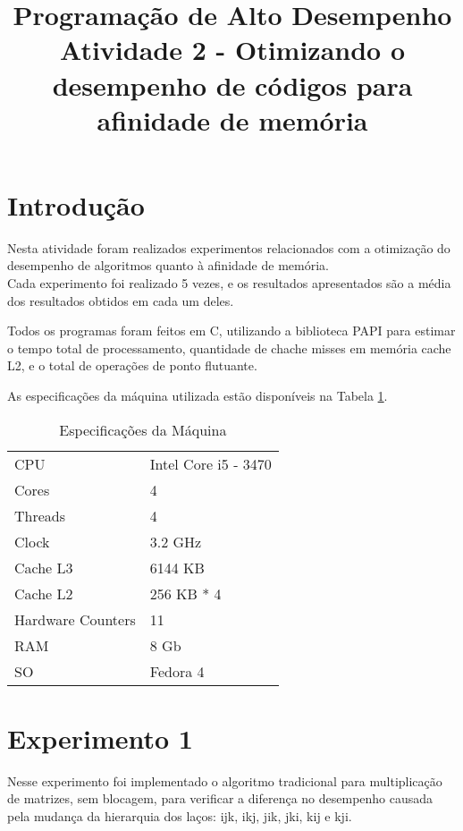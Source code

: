 \documentclass[conference]{IEEEtran}
\begin{document}
\title{Programação de Alto Desempenho\\
\large Atividade 2 - Otimizando o desempenho de códigos para afinidade de memória}

\author{
 }

\maketitle


\section{Introdução}
Nesta atividade foram realizados experimentos relacionados com a otimização do desempenho de algoritmos quanto à afinidade de memória.\\
Cada experimento foi realizado 5 vezes, e os resultados apresentados são a média dos resultados obtidos em cada um deles.

Todos os programas foram feitos em C, utilizando a biblioteca PAPI para estimar o tempo total de processamento, quantidade de chache misses em memória cache L2, e o total de operações de ponto flutuante.

As especificações da máquina utilizada estão disponíveis na Tabela \ref{tab:cpu}.

\begin{table}[htb!]
\centering
\caption{Especificações da Máquina}
\label{tab:cpu}
\begin{tabular}{ll}
 CPU & Intel Core i5 - 3470\\
 Cores & 4\\
 Threads & 4\\
 Clock & 3.2 GHz\\
 Cache L3 & 6144 KB \\
 Cache L2 & 256 KB * 4 \\
 Hardware Counters & 11 \\
 RAM & 8 Gb \\
 SO & Fedora 4
\end{tabular}
\end{table}

\section{Experimento 1}
Nesse experimento foi implementado o algoritmo tradicional para multiplicação de matrizes, sem blocagem, para verificar a diferença no desempenho causada pela mudança da hierarquia dos laços: ijk, ikj, jik, jki, kij e kji.
\end{document}
